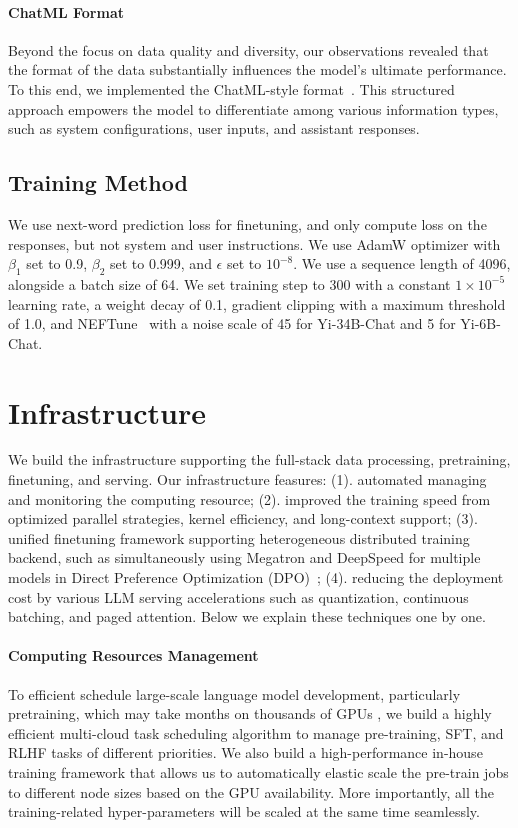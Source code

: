 \documentclass[numbers,sort&compress]{article}
\begin{document}
\paragraph{ChatML Format} Beyond the focus on data quality and diversity, our observations revealed that the format of the data substantially influences the model's ultimate performance. To this end, we implemented the ChatML-style format~\citep{chatml}. This structured approach empowers the model to differentiate among various information types, such as system configurations, user inputs, and assistant responses.

\subsection{Training Method}

We use next-word prediction loss for finetuning, and only compute loss on the responses, but not system and user instructions. 
We use AdamW optimizer
with $\beta_1$ set to 0.9, $\beta_2$ set to 0.999, and $\epsilon$ set to $10^{-8}$. 
We use a sequence length of 4096, alongside a batch size of 64.
We set training step to 300 with a constant $1\times 10^{-5}$ learning rate, a weight decay of 0.1, gradient clipping with a maximum threshold of 1.0, and NEFTune~\cite{jain2023neftune} with a noise scale of 45 for Yi-34B-Chat and 5 for Yi-6B-Chat.

\section{Infrastructure}
\label{sec:infra}

We build the infrastructure supporting the full-stack data processing, pretraining, finetuning, and serving. Our infrastructure feasures:
(1). automated managing and monitoring the computing resource; 
(2). improved the training speed from optimized parallel strategies, kernel efficiency, and long-context support;
(3). unified finetuning framework supporting heterogeneous distributed training backend, such as simultaneously using Megatron and DeepSpeed for multiple models in Direct Preference Optimization (DPO)~\citep{rafailov2023direct};
(4). reducing the deployment cost by various LLM serving accelerations such as quantization, continuous batching, and paged attention.
Below we explain these techniques one by one. 

\paragraph{Computing Resources Management} 
To efficient schedule large-scale language model development, particularly pretraining, which may take months on thousands of GPUs , 
we build a highly efficient multi-cloud task scheduling algorithm to manage pre-training, SFT, and RLHF tasks of different priorities. We also build a high-performance in-house training framework that allows us to automatically elastic scale the pre-train jobs to different node sizes based on the GPU availability. More importantly, all the training-related hyper-parameters will be scaled at the same time seamlessly. 
\end{document}
